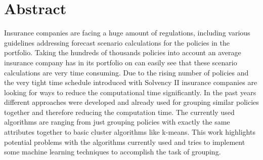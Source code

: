 

\chapter*{Abstract}
\label{cha:abstract}


Insurance companies are facing a huge amount of regulations, including various guidelines addressing forecast scenario calculations for the policies in the portfolio. Taking the hundreds of thousands policies into account an average insurance company has in its portfolio on can easily see that these scenario calculations are very time consuming. Due to the rising number of policies and the very tight time schedule introduced with Solvency II insurance companies are looking for ways to reduce the computational time significantly. In the past years different approaches were developed and already used for grouping similar policies together and therefore reducing the computation time. The currently used algorithms are ranging from just grouping policies with exactly the same attributes together to basic cluster algorithms like k-means. This work highlights potential problems with the algorithms currently used and tries to implement some machine learning techniques to accomplish the task of grouping. 
